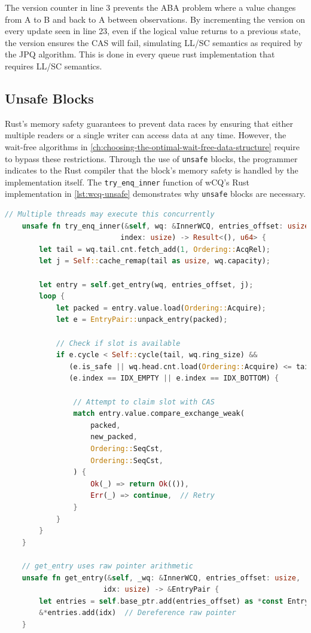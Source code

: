 The version counter in line 3 prevents the ABA problem where a value changes from A to B and back to A between observations. By incrementing the version on every update seen in line 23, even if the logical value returns to a previous state, the version ensures the \ac{CAS} will fail, simulating \ac{LL/SC} semantics as required by the \ac{JPQ} algorithm. This is done in every queue rust implementation that requires \ac{LL/SC} semantics.

\subsection{Unsafe Blocks}

Rust's memory safety guarantees to prevent data races by ensuring that either multiple readers or a single writer can access data at any time. However, the wait-free algorithms in \cref{ch:choosing-the-optimal-wait-free-data-structure} require to bypass these restrictions. Through the use of \texttt{unsafe} blocks, the programmer indicates to the Rust compiler that the block's memory safety is handled by the implementation itself. The \texttt{try\_enq\_inner} function of \ac{wCQ}'s Rust implementation in \cref{lst:wcq-unsafe} demonstrates why \texttt{unsafe} blocks are necessary.

\begin{lstlisting}[language=Rust, style=boxed, caption={Wait-free synchronisation requiring unsafe}, label={lst:wcq-unsafe}]
    // Multiple threads may execute this concurrently
    unsafe fn try_enq_inner(&self, wq: &InnerWCQ, entries_offset: usize,
                           index: usize) -> Result<(), u64> {
        let tail = wq.tail.cnt.fetch_add(1, Ordering::AcqRel);
        let j = Self::cache_remap(tail as usize, wq.capacity);
        
        let entry = self.get_entry(wq, entries_offset, j);
        loop {
            let packed = entry.value.load(Ordering::Acquire);
            let e = EntryPair::unpack_entry(packed);
            
            // Check if slot is available
            if e.cycle < Self::cycle(tail, wq.ring_size) &&
               (e.is_safe || wq.head.cnt.load(Ordering::Acquire) <= tail) &&
               (e.index == IDX_EMPTY || e.index == IDX_BOTTOM) {
                
                // Attempt to claim slot with CAS
                match entry.value.compare_exchange_weak(
                    packed,
                    new_packed,
                    Ordering::SeqCst,
                    Ordering::SeqCst,
                ) {
                    Ok(_) => return Ok(()),
                    Err(_) => continue,  // Retry
                }
            }
        }
    }
    
    // get_entry uses raw pointer arithmetic
    unsafe fn get_entry(&self, _wq: &InnerWCQ, entries_offset: usize, 
                       idx: usize) -> &EntryPair {
        let entries = self.base_ptr.add(entries_offset) as *const EntryPair;
        &*entries.add(idx)  // Dereference raw pointer
    }
\end{lstlisting}

